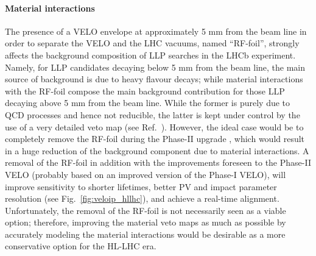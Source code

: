 \paragraph{Material interactions}
The presence of a VELO envelope at approximately 5 mm from the beam line in order to separate the VELO and the LHC vacuums, named ``RF-foil'', strongly affects the background composition of LLP searches in the LHCb experiment. Namely, for LLP candidates decaying below 5 mm from the beam line, the main source of background is due to heavy flavour decays; while material interactions with the RF-foil compose the main background contribution for those LLP decaying above 5 mm from the beam line. While the former is purely due to QCD processes and hence not reducible, the latter is kept under control by the use of a very detailed veto map (see Ref.~\cite{Aaij:2017rft}). However, the ideal case would be to completely remove the RF-foil during the Phase-II upgrade \cite{Aaij:2244311}, which would result in a huge reduction of the background component due to material interactions. A removal of the RF-foil in addition with the  improvements foreseen to the Phase-II VELO (probably based on an improved version of the Phase-I VELO), will improve sensitivity to shorter lifetimes, better PV and impact parameter resolution (see Fig.~\ref{fig:veloip_hllhc}), and achieve a real-time alignment. Unfortunately, the removal of the RF-foil is not necessarily seen as a viable option; therefore, improving  the material veto maps as much as possible by accurately modeling the material interactions would be desirable as a more conservative option for the HL-LHC era. 

